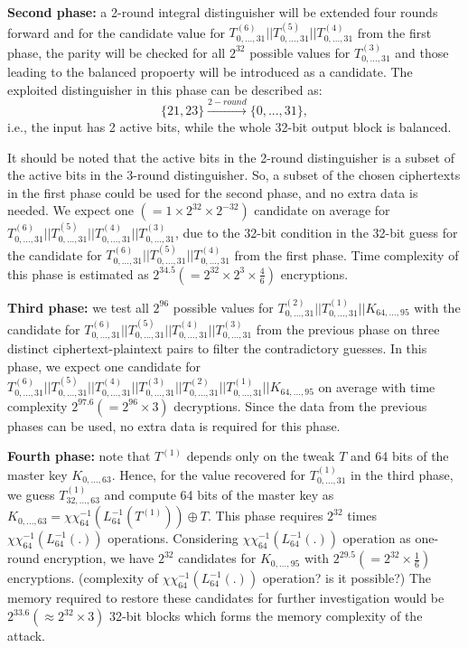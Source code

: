 \documentclass[a4paper]{llncs}
\begin{document}
\textbf{Second phase:} a 2-round integral distinguisher will be extended four rounds forward and for the candidate value for $T^{(6)}_{0,...,31}||T^{(5)}_{0,...,31}||T^{(4)}_{0,...,31}$ from the first phase, the parity will be checked for all $2^{32}$ possible values for $T^{(3)}_{0,...,31}$ and those leading to the balanced propoerty will be introduced as a candidate. The exploited distinguisher in this phase can be described as:
\begin{equation*}
\{21,23\}\xrightarrow{2-round}\{0,...,31\},
\end{equation*}
i.e., the input has 2 active bits, while the whole 32-bit output block is balanced. 

It should be noted that the active bits in the 2-round distinguisher is a subset of the active bits in the 3-round distinguisher. So, a subset of the chosen ciphertexts in the first phase could be used for the second phase, and no extra data is needed. 
We expect one $(=1\times 2^{32}\times 2^{-32})$ candidate on average for $T^{(6)}_{0,...,31}||T^{(5)}_{0,...,31}||T^{(4)}_{0,...,31}||T^{(3)}_{0,...,31}$, due to the 32-bit condition in the 32-bit guess for the candidate for $T^{(6)}_{0,...,31}||T^{(5)}_{0,...,31}||T^{(4)}_{0,...,31}$ from the first phase. Time complexity of this phase is estimated as $2^{34.5}(=2^{32}\times 2^{3} \times \frac{4}{6})$ encryptions.

\textbf{Third phase:} we test all $2^{96}$ possible values for $T^{(2)}_{0,...,31}||T^{(1)}_{0,...,31}||K_{64,...,95}$ with the candidate for $T^{(6)}_{0,...,31}||T^{(5)}_{0,...,31}||T^{(4)}_{0,...,31}||T^{(3)}_{0,...,31}$ from the previous phase on three distinct ciphertext-plaintext pairs to filter the contradictory guesses. In this phase, we expect one candidate for $T^{(6)}_{0,...,31}||T^{(5)}_{0,...,31}||T^{(4)}_{0,...,31}||T^{(3)}_{0,...,31}||T^{(2)}_{0,...,31}||T^{(1)}_{0,...,31}||K_{64,...,95}$ on average with time complexity $2^{97.6}(=2^{96}\times 3)$ decryptions. Since the data from the previous phases can be used, no extra data is required for this phase.

\textbf{Fourth phase:} note that $T^{(1)}$ depends only on the tweak $T$ and 64 bits of the master key $K_{0,...,63}$. Hence, for the value recovered for $T^{(1)}_{0,...,31}$ in the third phase, we guess $T^{(1)}_{32,...,63}$ and compute 64 bits of the master key as $K_{0,...,63}=\chi\!\!\!\chi_{64}^{-1}(L_{64}^{-1}(T^{(1)}))\oplus T$. This phase requires $2^{32}$ times $\chi\!\!\!\chi_{64}^{-1}(L_{64}^{-1}(.))$ operations. Considering $\chi\!\!\!\chi_{64}^{-1}(L_{64}^{-1}(.))$ operation as one-round encryption, we have $2^{32}$ candidates for $K_{0,...,95}$ with $2^{29.5}(=2^{32} \times \frac{1}{6})$ encryptions. {\color{red}(complexity of $\chi\!\!\!\chi_{64}^{-1}(L_{64}^{-1}(.))$ operation? is it possible?)} The memory required to restore these candidates for further investigation would be $2^{33.6}(\approx 2^{32}\times 3)$ 32-bit blocks which forms the memory complexity of the attack.
\end{document}
